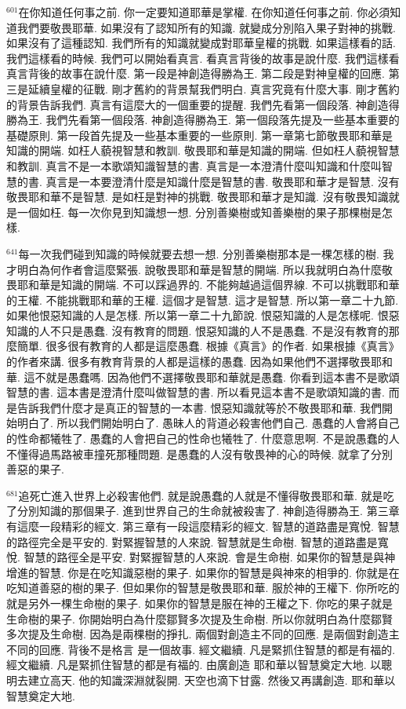 \documentclass{book}
\begin{document}
$^{601}$在你知道任何事之前.
你一定要知道耶華是掌權.
在你知道任何事之前.
你必須知道我們要敬畏耶華.
如果沒有了認知所有的知識.
就變成分別陷入果子對神的挑戰.
如果沒有了這種認知.
我們所有的知識就變成對耶華皇權的挑戰.
如果這樣看的話.
我們這樣看的時候.
我們可以開始看真言.
看真言背後的故事是說什麼.
我們這樣看真言背後的故事在說什麼.
第一段是神創造得勝為王.
第二段是對神皇權的回應.
第三是延續皇權的征戰.
剛才舊約的背景幫我們明白.
真言究竟有什麼大事.
剛才舊約的背景告訴我們.
真言有這麼大的一個重要的提醒.
我們先看第一個段落.
神創造得勝為王.
我們先看第一個段落.
神創造得勝為王.
第一個段落先提及一些基本重要的基礎原則.
第一段首先提及一些基本重要的一些原則.
第一章第七節敬畏耶和華是知識的開端.
如枉人藐視智慧和教訓.
敬畏耶和華是知識的開端.
但如枉人藐視智慧和教訓.
真言不是一本歌頌知識智慧的書.
真言是一本澄清什麼叫知識和什麼叫智慧的書.
真言是一本要澄清什麼是知識什麼是智慧的書.
敬畏耶和華才是智慧.
沒有敬畏耶和華不是智慧.
是如枉是對神的挑戰.
敬畏耶和華才是知識.
沒有敬畏知識就是一個如枉.
每一次你見到知識想一想.
分別善樂樹或知善樂樹的果子那棵樹是怎樣.

$^{641}$每一次我們碰到知識的時候就要去想一想.
分別善樂樹那本是一棵怎樣的樹.
我才明白為何作者會這麼緊張.
說敬畏耶和華是智慧的開端.
所以我就明白為什麼敬畏耶和華是知識的開端.
不可以踩過界的.
不能夠越過這個界線.
不可以挑戰耶和華的王權.
不能挑戰耶和華的王權.
這個才是智慧.
這才是智慧.
所以第一章二十九節.
如果他恨惡知識的人是怎樣.
所以第一章二十九節說.
恨惡知識的人是怎樣呢.
恨惡知識的人不只是愚蠢.
沒有教育的問題.
恨惡知識的人不是愚蠢.
不是沒有教育的那麼簡單.
很多很有教育的人都是這麼愚蠢.
根據《真言》的作者.
如果根據《真言》的作者來講.
很多有教育背景的人都是這樣的愚蠢.
因為如果他們不選擇敬畏耶和華.
這不就是愚蠢嗎.
因為他們不選擇敬畏耶和華就是愚蠢.
你看到這本書不是歌頌智慧的書.
這本書是澄清什麼叫做智慧的書.
所以看見這本書不是歌頌知識的書.
而是告訴我們什麼才是真正的智慧的一本書.
恨惡知識就等於不敬畏耶和華.
我們開始明白了.
所以我們開始明白了.
愚昧人的背道必殺害他們自己.
愚蠢的人會將自己的性命都犧牲了.
愚蠢的人會把自己的性命也犧牲了.
什麼意思啊.
不是說愚蠢的人不懂得過馬路被車撞死那種問題.
是愚蠢的人沒有敬畏神的心的時候.
就拿了分別善惡的果子.

$^{681}$追死亡進入世界上必殺害他們.
就是說愚蠢的人就是不懂得敬畏耶和華.
就是吃了分別知識的那個果子.
進到世界自己的生命就被殺害了.
神創造得勝為王.
第三章有這麼一段精彩的經文.
第三章有一段這麼精彩的經文.
智慧的道路盡是寬悅.
智慧的路徑完全是平安的.
對緊握智慧的人來說.
智慧就是生命樹.
智慧的道路盡是寬悅.
智慧的路徑全是平安.
對緊握智慧的人來說.
會是生命樹.
如果你的智慧是與神增進的智慧.
你是在吃知識惡樹的果子.
如果你的智慧是與神來的相爭的.
你就是在吃知道善惡的樹的果子.
但如果你的智慧是敬畏耶和華.
服於神的王權下.
你所吃的就是另外一棵生命樹的果子.
如果你的智慧是服在神的王權之下.
你吃的果子就是生命樹的果子.
你開始明白為什麼鄒賢多次提及生命樹.
所以你就明白為什麼鄒賢多次提及生命樹.
因為是兩棵樹的掙扎.
兩個對創造主不同的回應.
是兩個對創造主不同的回應.
背後不是格言 是一個故事.
經文繼續.
凡是緊抓住智慧的都是有福的.
經文繼續.
凡是緊抓住智慧的都是有福的.
由廣創造 耶和華以智慧奠定大地.
以聰明去建立高天.
他的知識深淵就裂開.
天空也滴下甘露.
然後又再講創造.
耶和華以智慧奠定大地.
\end{document}
